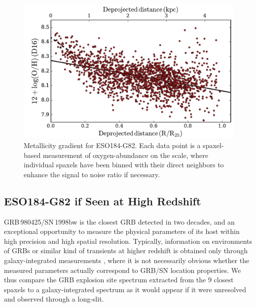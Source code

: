 \documentclass[traditabstract]{aa}
\begin{document}

\begin{figure}
\includegraphics[angle=0, width=0.99\columnwidth]{Figs/MUSE_SN1998bw_metgrad.pdf}
\caption{Metallicity gradient for ESO184-G82. Each data point is a spaxel-based measurement of oxygen-abundance on the \citet{2016Ap&SS.361...61D} scale, where individual spaxels have been binned with their direct neighbors to enhance the signal to noise ratio if necessary.}
\label{fig:metgrad}
\end{figure}

\subsection{ESO184-G82 if Seen at High Redshift}

GRB\,980425/SN\,1998bw is the closest GRB detected in two decades, and an exceptional opportunity to measure the physical parameters of its host within high precision and high spatial resolution. Typically, information on environments of GRBs or similar kind of transients  at higher redshift is obtained only through galaxy-integrated measurements \citep{2015A&A...581A.125K, 2016A&A...590A.129J}, where it is not necessarily obvious whether the measured parameters actually correspond to GRB/SN location properties. We thus compare the GRB explosion site spectrum extracted from the 9 closest spaxels to a galaxy-integrated spectrum as it would appear if it were unresolved and observed through a long-slit. 
\end{document}
